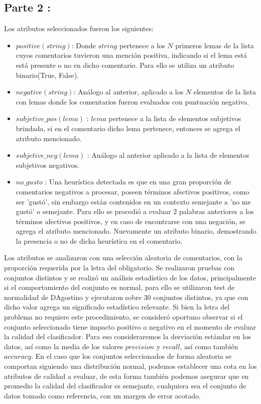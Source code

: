 \documentclass[12pt]{article}
\begin{document}
\subsection{Parte 2 :} \label{sub:part2}
Los atributos seleccionados fueron los siguientes:
\begin{itemize}
  \item $positive(string)$: Donde $string$ pertenece a los $N$ primeros lemas de la lista cuyos comentarios tuvieron una mención positiva, indicando si el lema está está presente o no en dicho comentario. Para ello se utiliza un atributo binario(True, False).
  \item $negative(string)$: Análogo al anterior, aplicado a los $N$ elementos de la lista con lemas donde los comentarios fueron evaluados con puntuación negativa.
  \item $subjetive\_pos(lema)$ : $lema$ pertenece a la lista de elementos subjetivos brindada, si en el comentario dicho lema pertenece, entonces se agrega el atributo mencionado.
  \item $subjetive\_neg(lema)$ : Análogo al anterior aplicado a la lista de elementos subjetivos negativos.
  \item $no\_gusto$ : Una heurística detectada es que en una gran proporción de comentarios negativos a procesar, poseen términos afectivos positivos, como ser 'gustó', sin embargo están contenidos en un contexto semejante a 'no me gustó' o semejante. Para ello se procedió a evaluar 2 palabras anteriores a los términos afectivos positivos, y en caso de encontrarse con una negación, se agrega el atributo mencionado. Nuevamente un atributo binario, demostrando la presencia o no de dicha heurística en el comentario.
\end{itemize}
Los atributos se analizaron con una selección aleatoria de comentarios, con la proporción requerida por la letra del obligatorio. Se realizaron pruebas con conjuntos distintos y se realizó un análisis estadístico de los datos, principalmente si el comportamiento del conjunto es normal, para ello se utilizaron test de normalidad de DAgostino y ejecutaron sobre 30 conjuntos distintos, ya que con dicho valor agrega un significado estadístico relevante. Si bien la letra del problema no requiere este procedimiento, se consideró oportuno observar si el conjunto seleccionado tiene impacto positivo o negativo en el momento de evaluar la calidad del clasificador. Para eso consideraremos la desviación estándar en los datos, así como la media de los valores $precision$ y $recall$, así como también $accuracy$. En el caso que los conjuntos seleccionados de forma aleatoria se comportan siguiendo una distribución normal, podemos establecer una cota en los atributos de calidad a evaluar, de esta forma también podemos asegurar que en promedio la calidad del clasificador es semejante, cualquiera sea el conjunto de datos tomado como referencia, con un margen de error acotado.
\end{document}
